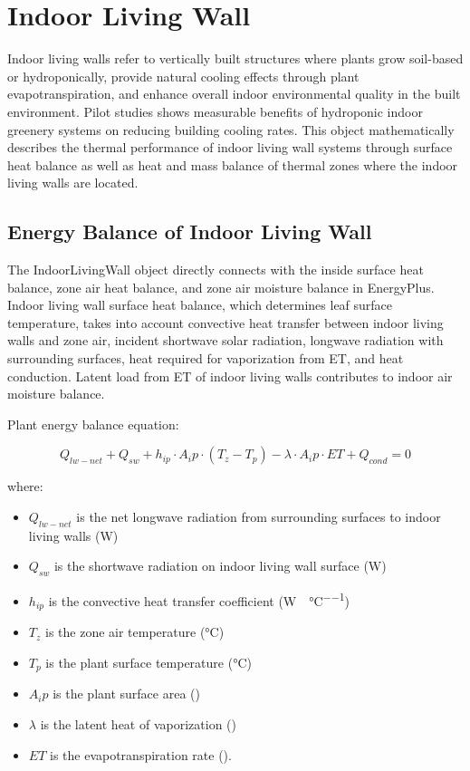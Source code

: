 \section{Indoor Living Wall }\label{indoor-living-wall}

Indoor living walls refer to vertically built structures where plants grow soil-based or hydroponically, provide natural cooling effects through plant evapotranspiration, and enhance overall indoor environmental quality in the built environment. Pilot studies shows measurable benefits of hydroponic indoor greenery systems on reducing building cooling rates. This object mathematically describes the thermal performance of indoor living wall systems through surface heat balance as well as heat and mass balance of thermal zones where the indoor living walls are located.

\subsection{Energy Balance of Indoor Living Wall}\label{energy-balance-of-indoor-living-wall}

The IndoorLivingWall object directly connects with the inside surface heat balance, zone air heat balance, and zone air moisture balance in EnergyPlus. Indoor living wall surface heat balance, which determines leaf surface temperature, takes into account convective heat transfer between indoor living walls and zone air, incident shortwave solar radiation, longwave radiation with surrounding surfaces, heat required for vaporization from ET, and heat conduction. Latent load from ET of indoor living walls contributes to indoor air moisture balance.

Plant energy balance equation:

\begin{equation}
Q_{lw-net}+Q_{sw}+h_{ip} \cdot A_ip \cdot (T_z - T_p )-\lambda \cdot A_ip \cdot ET+Q_{cond}=0
\end{equation}

where:

\begin{itemize}
\tightlist
\item
  \(Q_{lw-net}\) is the net longwave radiation from surrounding surfaces to indoor living walls (\si{\watt})
\item
  \(Q_{sw}\) is the shortwave radiation on indoor living wall surface (\si{\watt})
\item
  \(h_{ip}\) is the convective heat transfer coefficient (\si{\watt\per\area\per\celsius})
\item
  \(T_z\) is the zone air temperature (\si{\celsius})
\item
  \(T_p\) is the plant surface temperature (\si{\celsius})
\item
  \(A_ip\) is the plant surface area (\si{\area})
\item
  \(\lambda\) is the latent heat of vaporization (\si{\specificEnthalpy})
\item
  \(ET\) is the evapotranspiration rate (\si{\evapotranspirationRate}).
\end{itemize}

